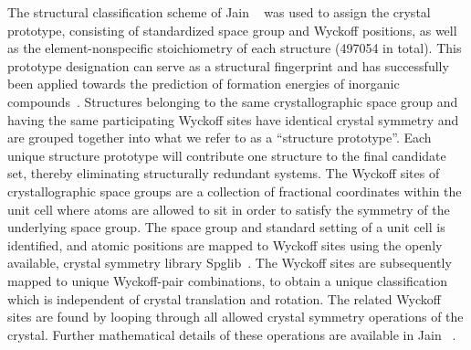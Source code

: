 %
%
The structural classification scheme of Jain ~\cite{Jain2018} was used to assign the crystal prototype,
consisting of standardized space group and Wyckoff positions,
as well as the element-nonspecific stoichiometry of each structure (\num{497054} in total).
%
This prototype designation can serve as a structural fingerprint and has successfully been applied towards the prediction of formation energies of inorganic compounds~\cite{Jain2018}.
%
Structures belonging to the same crystallographic space group and having the same participating Wyckoff sites have identical crystal symmetry and are grouped together into what we refer to as a ``structure prototype''.
%
Each unique structure prototype will contribute one structure to the final candidate set, thereby eliminating structurally redundant systems.
%
%
The Wyckoff sites of crystallographic space groups are a collection of fractional coordinates within the unit cell where atoms are allowed to sit in order to satisfy the symmetry of the underlying space group.
%
The space group and standard setting of a unit cell is identified, and atomic positions are mapped to Wyckoff sites using the openly available, crystal symmetry library Spglib~\cite{spglib}.
%
The Wyckoff sites are subsequently mapped to unique Wyckoff-pair combinations, to obtain a unique classification which is independent of crystal translation and rotation.
%
The related Wyckoff sites are found by looping through all allowed crystal symmetry operations of the crystal.
%
Further mathematical details of these operations are available in Jain ~\cite{Jain2018}.


